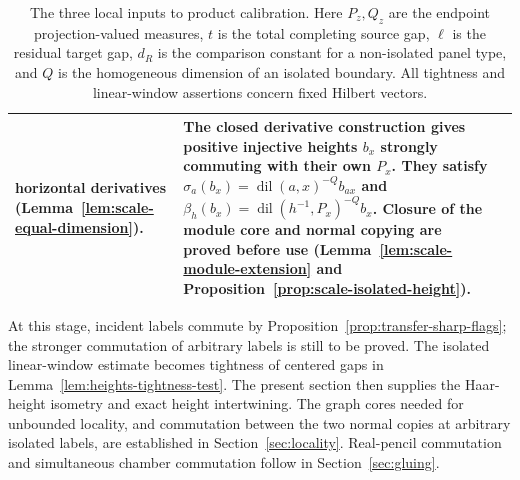 \begin{table}[!htbp]
\begin{tabular}{@{}>{\raggedright\arraybackslash}p{22mm}>{\raggedright\arraybackslash}p{58mm}>{\raggedright\arraybackslash}p{57mm}@{}}
horizontal derivatives (Lemma~\ref{lem:scale-equal-dimension}).
&
The closed derivative construction gives positive injective heights
$b_x$ strongly commuting with their own $P_x$. They satisfy
$\sigma_a(b_x)=\operatorname{dil}(a,x)^{-Q}b_{ax}$ and
$\beta_h(b_x)=\operatorname{dil}(h^{-1},P_x)^{-Q}b_x$.
Closure of the module core and normal copying are proved before use
(Lemma~\ref{lem:scale-module-extension} and
Proposition~\ref{prop:scale-isolated-height}).\\
\bottomrule
\end{tabular}
\caption{The three local inputs to product calibration. Here $P_z,Q_z$
are the endpoint projection-valued measures, $t$ is the total completing
source gap, $\ell$ is the residual target gap, $d_R$ is the comparison
constant for a non-isolated panel type, and $Q$ is the homogeneous
dimension of an isolated boundary. All tightness and linear-window
assertions concern fixed Hilbert vectors.}
\label{tab:local-branches}
\end{table}

At this stage, incident labels commute by
Proposition~\ref{prop:transfer-sharp-flags}; the stronger commutation of
arbitrary labels is still to be proved. The isolated linear-window
estimate becomes tightness of centered gaps in
Lemma~\ref{lem:heights-tightness-test}. The present section then supplies
the Haar-height isometry and exact height intertwining. The graph cores
needed for unbounded locality, and commutation between the two normal
copies at arbitrary isolated labels, are established in
Section~\ref{sec:locality}. Real-pencil commutation and simultaneous
chamber commutation follow in Section~\ref{sec:gluing}.
